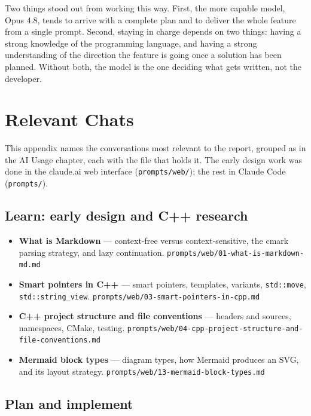 \documentclass[12pt]{report}
\begin{document}
Two things stood out from working this way. First, the more capable model, Opus 4.8, tends to arrive with a complete plan and to deliver the whole feature from a single prompt. Second, staying in charge depends on two things: having a strong knowledge of the programming language, and having a strong understanding of the direction the feature is going once a solution has been planned. Without both, the model is the one deciding what gets written, not the developer.


\appendix

\chapter{Relevant Chats}

 This appendix names the conversations most relevant to the report, grouped as in the AI Usage chapter, each with the file that holds it. The early design work was done in the claude.ai web interface (\verb|prompts/web/|); the rest in Claude Code (\verb|prompts/|).

\section{Learn: early design and C++ research}

\begin{itemize}
  \item \textbf{What is Markdown} --- context-free versus context-sensitive, the cmark parsing strategy, and lazy continuation. \texttt{prompts/web/01-what-is-markdown-md.md}
  \item \textbf{Smart pointers in C++} --- smart pointers, templates, variants, \verb|std::move|, \verb|std::string_view|. \texttt{prompts/web/03-smart-pointers-in-cpp.md}
  \item \textbf{C++ project structure and file conventions} --- headers and sources, namespaces, CMake, testing. \texttt{prompts/web/04-cpp-project-structure-and-file-conventions.md}
  \item \textbf{Mermaid block types} --- diagram types, how Mermaid produces an SVG, and its layout strategy. \texttt{prompts/web/13-mermaid-block-types.md}
\end{itemize}

\section{Plan and implement}
\end{document}
